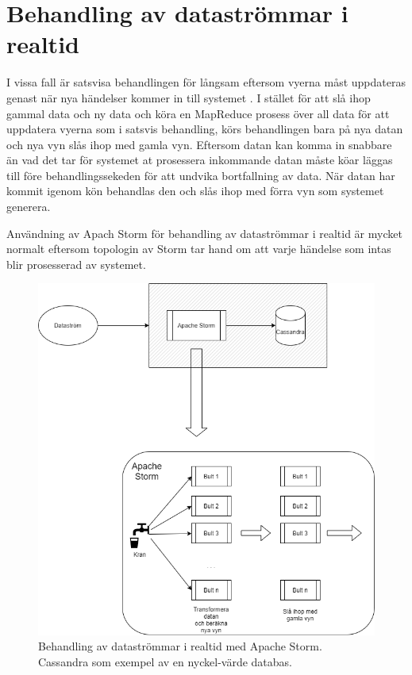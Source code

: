 \section{Behandling av dataströmmar i realtid}

I vissa fall är satsvisa behandlingen för långsam eftersom vyerna måst uppdateras genast när
nya händelser kommer in till systemet \citep{marz2013big}. I stället för att slå ihop gammal
data och ny data och köra en MapReduce prosess över all data för att uppdatera vyerna som i 
satsvis behandling, körs behandlingen bara på nya datan och nya vyn slås ihop med gamla vyn.
Eftersom datan kan komma in snabbare än vad det tar för systemet at prosessera inkommande datan
måste köar läggas till före behandlingssekeden för att undvika bortfallning av data. När datan
har kommit igenom kön behandlas den och slås ihop med förra vyn som systemet generera.

Användning av Apach Storm för behandling av dataströmmar i realtid är mycket normalt eftersom 
topologin av Storm tar hand om att varje händelse som intas blir prosesserad av systemet.

\begin{figure}[h]
    \centering
    \includegraphics[scale=0.7]{img/speed-layer.png}
    \caption{Behandling av dataströmmar i realtid med Apache Storm. Cassandra som exempel av en nyckel-värde databas.}
    \label{fig:mesh1}
\end{figure}


